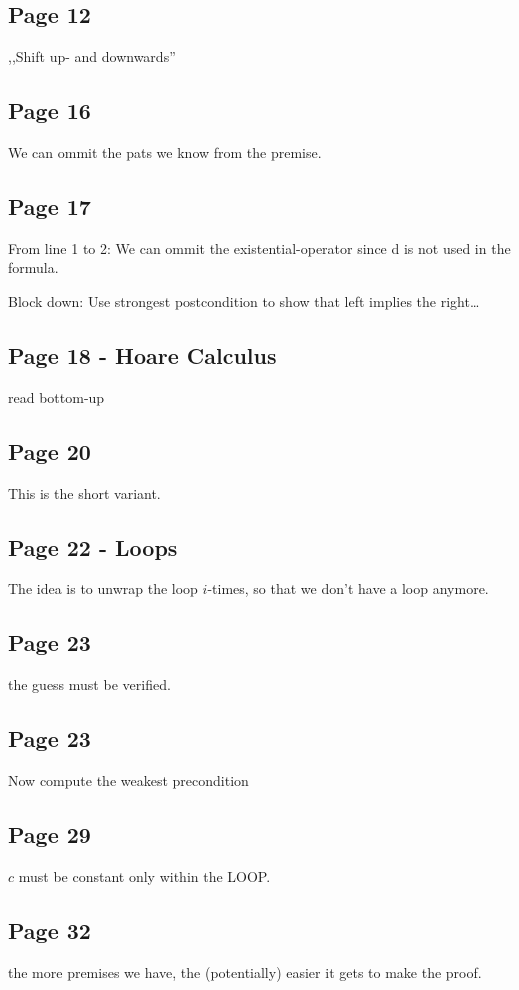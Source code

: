 \documentclass[a4paper]{article}
\begin{document}
\subsection{Page 12}
,,Shift up- and downwards''

\subsection{Page 16}
We can ommit the pats we know from the premise.

\subsection{Page 17}
From line 1 to 2: We can ommit the existential-operator since d is not used in
the formula.

Block down: Use strongest postcondition to show that left implies the right\ldots

\subsection{Page 18 - Hoare Calculus}
read bottom-up

\subsection{Page 20}

This is the short variant.

\subsection{Page 22 - Loops}
The idea is to unwrap the loop $i$-times, so that we don't have a loop anymore.

\subsection{Page 23} the guess must be verified.

\subsection{Page 23}
Now compute the weakest precondition


\subsection{Page 29}
$c$ must be constant only within the LOOP.

\subsection{Page 32}
the more premises we have, the (potentially) easier it gets to make the proof.
\end{document}
